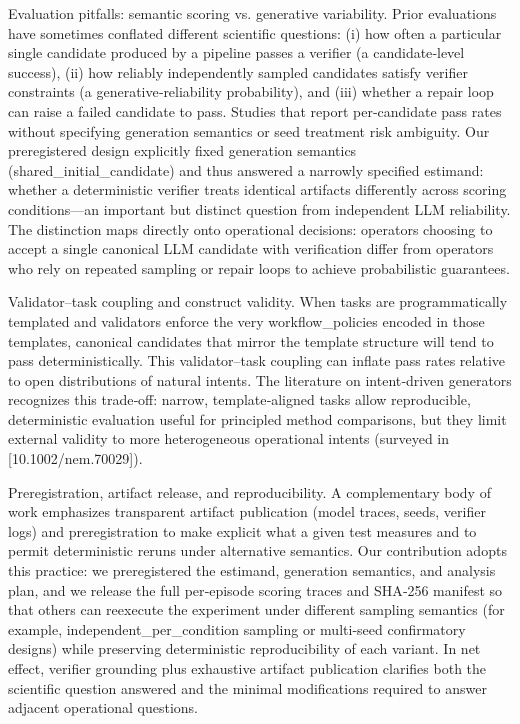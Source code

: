 \documentclass[conference]{IEEEtran}
\begin{document}
Evaluation pitfalls: semantic scoring vs. generative variability. Prior evaluations have sometimes conflated different scientific questions: (i) how often a particular single candidate produced by a pipeline passes a verifier (a candidate‑level success), (ii) how reliably independently sampled candidates satisfy verifier constraints (a generative‑reliability probability), and (iii) whether a repair loop can raise a failed candidate to pass. Studies that report per‑candidate pass rates without specifying generation semantics or seed treatment risk ambiguity. Our preregistered design explicitly fixed generation semantics (shared\_initial\_candidate) and thus answered a narrowly specified estimand: whether a deterministic verifier treats identical artifacts differently across scoring conditions---an important but distinct question from independent LLM reliability. The distinction maps directly onto operational decisions: operators choosing to accept a single canonical LLM candidate with verification differ from operators who rely on repeated sampling or repair loops to achieve probabilistic guarantees.

Validator--task coupling and construct validity. When tasks are programmatically templated and validators enforce the very workflow\_policies encoded in those templates, canonical candidates that mirror the template structure will tend to pass deterministically. This validator--task coupling can inflate pass rates relative to open distributions of natural intents. The literature on intent‑driven generators recognizes this trade‑off: narrow, template‑aligned tasks allow reproducible, deterministic evaluation useful for principled method comparisons, but they limit external validity to more heterogeneous operational intents (surveyed in [10.1002/nem.70029]).

Preregistration, artifact release, and reproducibility. A complementary body of work emphasizes transparent artifact publication (model traces, seeds, verifier logs) and preregistration to make explicit what a given test measures and to permit deterministic reruns under alternative semantics. Our contribution adopts this practice: we preregistered the estimand, generation semantics, and analysis plan, and we release the full per‑episode scoring traces and SHA‑256 manifest so that others can reexecute the experiment under different sampling semantics (for example, independent\_per\_condition sampling or multi‑seed confirmatory designs) while preserving deterministic reproducibility of each variant. In net effect, verifier grounding plus exhaustive artifact publication clarifies both the scientific question answered and the minimal modifications required to answer adjacent operational questions.
\end{document}
